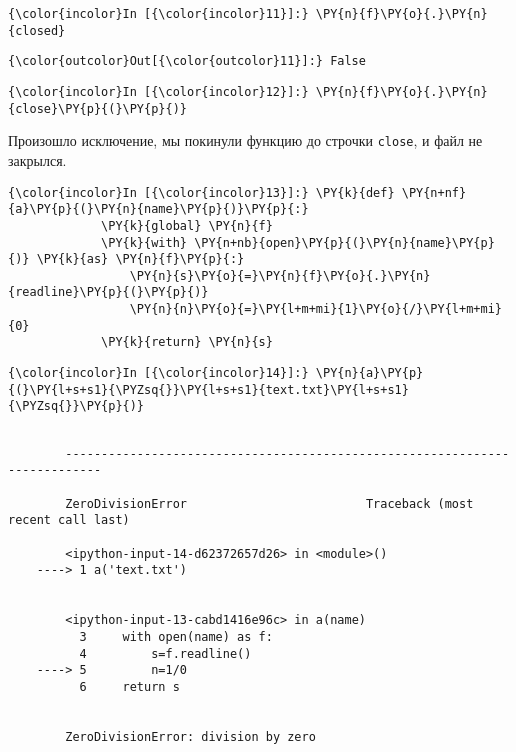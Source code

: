     \begin{Verbatim}[commandchars=\\\{\}]
{\color{incolor}In [{\color{incolor}11}]:} \PY{n}{f}\PY{o}{.}\PY{n}{closed}
\end{Verbatim}

            \begin{Verbatim}[commandchars=\\\{\}]
{\color{outcolor}Out[{\color{outcolor}11}]:} False
\end{Verbatim}
        
    \begin{Verbatim}[commandchars=\\\{\}]
{\color{incolor}In [{\color{incolor}12}]:} \PY{n}{f}\PY{o}{.}\PY{n}{close}\PY{p}{(}\PY{p}{)}
\end{Verbatim}

    Произошло исключение, мы покинули функцию до строчки \texttt{close}, и
файл не закрылся.

    \begin{Verbatim}[commandchars=\\\{\}]
{\color{incolor}In [{\color{incolor}13}]:} \PY{k}{def} \PY{n+nf}{a}\PY{p}{(}\PY{n}{name}\PY{p}{)}\PY{p}{:}
             \PY{k}{global} \PY{n}{f}
             \PY{k}{with} \PY{n+nb}{open}\PY{p}{(}\PY{n}{name}\PY{p}{)} \PY{k}{as} \PY{n}{f}\PY{p}{:}
                 \PY{n}{s}\PY{o}{=}\PY{n}{f}\PY{o}{.}\PY{n}{readline}\PY{p}{(}\PY{p}{)}
                 \PY{n}{n}\PY{o}{=}\PY{l+m+mi}{1}\PY{o}{/}\PY{l+m+mi}{0}
             \PY{k}{return} \PY{n}{s}
\end{Verbatim}

    \begin{Verbatim}[commandchars=\\\{\}]
{\color{incolor}In [{\color{incolor}14}]:} \PY{n}{a}\PY{p}{(}\PY{l+s+s1}{\PYZsq{}}\PY{l+s+s1}{text.txt}\PY{l+s+s1}{\PYZsq{}}\PY{p}{)}
\end{Verbatim}

    \begin{Verbatim}[commandchars=\\\{\}]

        ---------------------------------------------------------------------------

        ZeroDivisionError                         Traceback (most recent call last)

        <ipython-input-14-d62372657d26> in <module>()
    ----> 1 a('text.txt')
    

        <ipython-input-13-cabd1416e96c> in a(name)
          3     with open(name) as f:
          4         s=f.readline()
    ----> 5         n=1/0
          6     return s


        ZeroDivisionError: division by zero

    \end{Verbatim}

